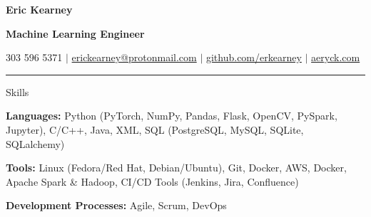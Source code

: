 \documentclass[12pt]{resumeclass}
\begin{document}
\vspace{12pt}
\centerline{\textbf{\LARGE{Eric Kearney}}}
\vspace{2pt}
\centerline{\textbf{\large{Machine Learning Engineer}}}
\vspace{2pt}
\centerline{303 596 5371 $|$ \href{mailto:erickearney@protonmail.com}{erickearney@protonmail.com} $|$ \href{https://github.com/erkearney}{github.com/erkearney} $|$ \href{https://aeryck.com}{aeryck.com}}
\vspace{2pt}
\rule{\textwidth}{0.4pt}
\vspace{0.5pt}

\resumesect
    {Skills}
    {\textbf{Languages:} \normalsize{Python (PyTorch, NumPy, Pandas, Flask, OpenCV, PySpark, Jupyter), C/C++, Java, XML, SQL (PostgreSQL, MySQL, SQLite, SQLalchemy)}


    \vspace{3pt}
    \textbf{Tools:} \normalsize{Linux (Fedora/Red Hat, Debian/Ubuntu), Git, Docker,  AWS, Docker, Apache Spark \& Hadoop, CI/CD Tools (Jenkins, Jira, Confluence)}


    \vspace{3pt}
    \textbf{Development Processes:} \normalsize{Agile, Scrum, DevOps}}
\end{document}
